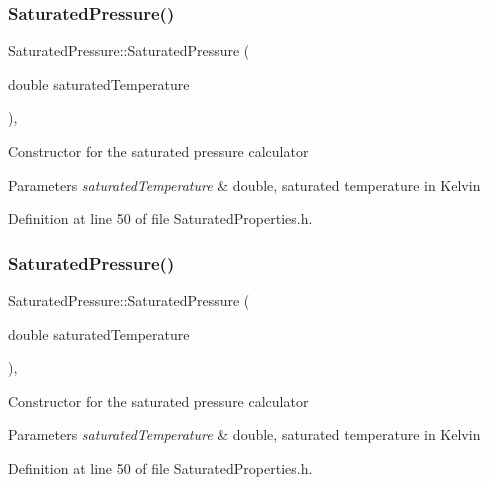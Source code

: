 \subsubsection{\texorpdfstring{Saturated\+Pressure()}{SaturatedPressure()}\hspace{0.1cm}{\footnotesize\ttfamily [1/3]}}
{\footnotesize\ttfamily Saturated\+Pressure\+::\+Saturated\+Pressure (\begin{DoxyParamCaption}\item[{double}]{saturated\+Temperature }\end{DoxyParamCaption})\hspace{0.3cm}{\ttfamily [inline]}, {\ttfamily [explicit]}}

Constructor for the saturated pressure calculator 
\begin{DoxyParams}{Parameters}
{\em saturated\+Temperature} & double, saturated temperature in Kelvin \\
\hline
\end{DoxyParams}


Definition at line 50 of file Saturated\+Properties.\+h.

\mbox{\label{class_saturated_pressure_a67020b0bb7588c643e12e256fa25e0bc}} 
\subsubsection{\texorpdfstring{Saturated\+Pressure()}{SaturatedPressure()}\hspace{0.1cm}{\footnotesize\ttfamily [2/3]}}
{\footnotesize\ttfamily Saturated\+Pressure\+::\+Saturated\+Pressure (\begin{DoxyParamCaption}\item[{double}]{saturated\+Temperature }\end{DoxyParamCaption})\hspace{0.3cm}{\ttfamily [inline]}, {\ttfamily [explicit]}}

Constructor for the saturated pressure calculator 
\begin{DoxyParams}{Parameters}
{\em saturated\+Temperature} & double, saturated temperature in Kelvin \\
\hline
\end{DoxyParams}


Definition at line 50 of file Saturated\+Properties.\+h.

